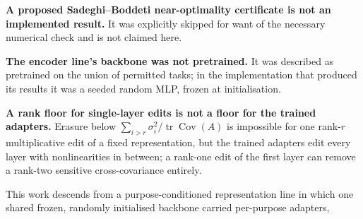 \item \textbf{A proposed Sadeghi--Boddeti near-optimality certificate is not an implemented result.}
It was explicitly skipped for want of the necessary numerical check and is not claimed here.
\item \textbf{The encoder line's backbone was not pretrained.} It was described as pretrained on the
union of permitted tasks; in the implementation that produced its results it was a seeded random MLP,
frozen at initialisation.
\item \textbf{A rank floor for single-layer edits is not a floor for the trained adapters.} Erasure below
$\sum_{i>r}\sigma_i^2/\operatorname{tr}\operatorname{Cov}(A)$ is impossible for one rank-$r$
multiplicative edit of a fixed representation, but the trained adapters edit every layer with
nonlinearities in between; a rank-one edit of the first layer can remove a rank-two sensitive
cross-covariance entirely.

This work descends from a purpose-conditioned representation line in which one shared frozen, randomly
initialised backbone carried per-purpose adapters,

